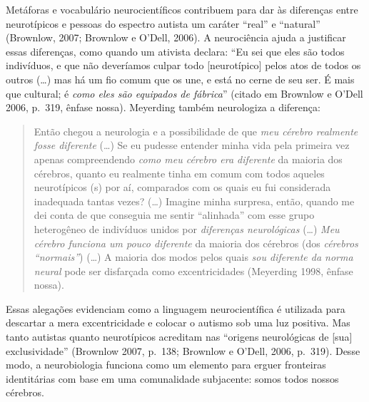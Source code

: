 Metáforas e vocabulário neurocientíficos contribuem para dar às
diferenças entre neurotípicos e pessoas do espectro autista um caráter
``real'' e ``natural'' (Brownlow, 2007; Brownlow e O'Dell, 2006). A
neurociência ajuda a justificar essas diferenças, como quando um
ativista declara: ``Eu sei que eles são todos indivíduos, e que não
deveríamos culpar todo  {[}neurotípico{]} pelos atos de todos os
outros  (\ldots{}) mas há um fio comum que os une, e está no cerne de seu
ser. É mais que cultural; é \emph{como eles são equipados de fábrica}''
(citado em Brownlow e O'Dell 2006, p.~319, ênfase nossa). Meyerding
também neurologiza a diferença:

\begin{quote}
Então chegou a neurologia e a possibilidade de que \emph{meu cérebro
realmente fosse diferente} (\ldots{}) Se eu pudesse entender minha vida pela
primeira vez apenas compreendendo \emph{como meu cérebro era diferente}
da maioria dos cérebros, quanto eu realmente tinha em comum com todos
aqueles neurotípicos (s) por aí, comparados com os quais eu fui
considerada inadequada tantas vezes? (\ldots{}) Imagine minha surpresa,
então, quando me dei conta de que conseguia me sentir ``alinhada'' com
esse grupo heterogêneo de indivíduos unidos por \emph{diferenças
neurológicas} (\ldots{}) \emph{Meu cérebro funciona um pouco diferente} da
maioria dos cérebros (dos \emph{cérebros ``normais''}) (\ldots{}) A maioria
dos modos pelos quais \emph{sou diferente da norma neural} pode ser
disfarçada como excentricidades (Meyerding 1998, ênfase nossa).
\end{quote}

Essas alegações evidenciam como a linguagem neurocientífica é utilizada
para descartar a mera excentricidade e colocar o autismo sob uma luz
positiva. Mas tanto autistas quanto neurotípicos acreditam nas ``origens
neurológicas de {[}sua{]} exclusividade'' (Brownlow 2007, p.~138;
Brownlow e O'Dell, 2006, p.~319). Desse modo, a neurobiologia funciona
como um elemento para erguer fronteiras identitárias com base em uma
comunalidade subjacente: somos todos nossos cérebros.

